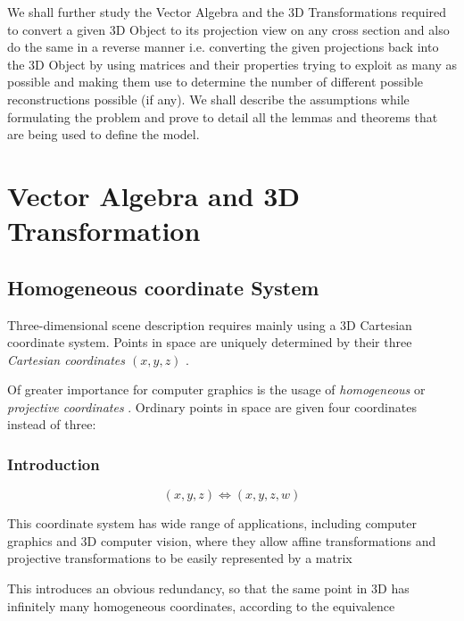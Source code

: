 \documentclass[12pt]{report}
\begin{document}
We shall further study the Vector Algebra and the 3D Transformations required to convert a given 3D Object to its projection view on any cross section and also do the same in a reverse manner i.e. converting the given projections back into the 3D Object by using matrices and their properties trying to exploit as many as possible and making them use to determine the number of different possible reconstructions possible (if any). We shall describe the assumptions while formulating the problem and prove to detail all the lemmas and theorems that are being used to define the model.
\\

\chapter{Vector Algebra and 3D Transformation}

\section{Homogeneous coordinate System}

Three-dimensional scene description requires mainly using a 3D Cartesian coordinate system. Points in space are uniquely determined by their three \textit{ Cartesian coordinates $(x, y, z)$ } .

\vspace{0.5cm}
\noindent Of greater importance for computer graphics is the usage of \textit{ homogeneous} or \textit{projective coordinates }. Ordinary points in space are given four coordinates instead of three:


\subsection{Introduction}

\begin{center} 
\[ ( x , y , z ) \Leftrightarrow ( x , y , z , w ) \]
\end{center}

\vspace{.3cm}
This coordinate system has wide range of applications, including computer graphics and 3D computer vision, where they allow affine transformations and projective transformations to be easily represented by a matrix
\\
\vspace{.3cm}

This introduces an obvious redundancy, so that the same point in 3D has infinitely many homogeneous coordinates, according to the equivalence
\\
\vspace{.3cm}
\end{document}

